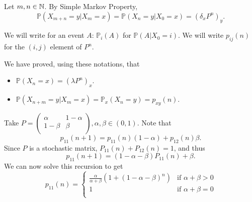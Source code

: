 \documentclass[a4paper,11pt]{article}
\begin{document}
Let $m,n\in {\mathbb{N}}$. By Simple Markov Property, 
\[
    \mathbb{P}(X_{m+n}=y|X_m=x)=\mathbb{P}(X_n=y|X_0=x)=(\delta_x P^n)_y.
\]
\begin{notation}
    We will write for an event $A$: $ \mathbb{P}_i(A) $ for $ \mathbb{P}(A|X_0=i) $. We will write $ p_{ij}(n) $ for the $(i,j)$ element of $P^n$.
\end{notation}
We have proved, using these notations, that 
\begin{theorem}
    \begin{itemize}
        \item $ \mathbb{P}(X_n=x)=(\lambda P^n)_x $.
        \item $ \mathbb{P}(X_{n+m}=y|X_m=x)=\mathbb{P}_x(X_n=y)=p_{xy}(n) $.
    \end{itemize}
\end{theorem}
\begin{example}
    Take $ P = \begin{pmatrix}
        \alpha & 1-\alpha \\
        1-\beta & \beta \\
    \end{pmatrix}, \alpha,\beta\in (0,1). $
    Note that 
    \[
        p_{11}(n+1) = p_{11}(n)(1-\alpha)+p_{12}(n)\beta.
    \]
    Since $P$ is a stochastic matrix, $P_{11}(n)+P_{12}(n)=1 $, and thus 
    \[
        p_{11}(n+1)=(1-\alpha-\beta)P_{11}(n)+\beta.
    \]
    We can now solve this recursion to get 
    \[
        p_{11}(n)=\begin{cases}
        \frac{\alpha}{\alpha+\beta}\left( 1+(1-\alpha-\beta)^n \right) &\text{if }\alpha+\beta>0\\
        1 &\text{if }\alpha+\beta=0\\
        \end{cases} 
    \]
\end{example}
\end{document}
